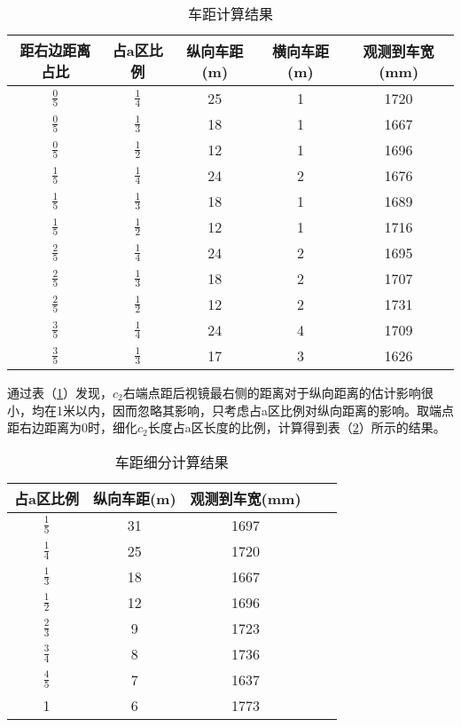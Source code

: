 \documentclass[withoutpreface,bwprint]{cumcmthesis} %
\begin{document}
\begin{table}[!h]
\centering
\caption{车距计算结果}
\label{车距计算结果}
    \begin{tabular}{|c|c|c|c|c|}
    \hline
    距右边距离占比                        & 占a区比例                        & 纵向车距(m) & 横向车距(m) & 观测到车宽(mm) \\ \hline
    $\frac{0}{5}$ & $\frac{1}{4}$ & 25   & 1    & 1720  \\ \hline
    $\frac{0}{5}$ & $\frac{1}{3}$ & 18   & 1    & 1667  \\ \hline
    $\frac{0}{5}$ & $\frac{1}{2}$ & 12   & 1    & 1696  \\ \hline
    $\frac{1}{5}$ & $\frac{1}{4}$ & 24   & 2   & 1676  \\ \hline
    $\frac{1}{5}$ & $\frac{1}{3}$ & 18   & 1    & 1689  \\ \hline
    $\frac{1}{5}$ & $\frac{1}{2}$ & 12   & 1    & 1716  \\ \hline
    $\frac{2}{5}$ & $\frac{1}{4}$ & 24   & 2    & 1695  \\ \hline
    $\frac{2}{5}$ & $\frac{1}{3}$ & 18   & 2    & 1707  \\ \hline
    $\frac{2}{5}$ & $\frac{1}{2}$ & 12   & 2    & 1731  \\ \hline
    $\frac{3}{5}$ & $\frac{1}{4}$ & 24   & 4    & 1709  \\ \hline
   	$\frac{3}{5}$ & $\frac{1}{3}$ & 17   & 3    & 1626  \\ \hline
    \end{tabular}
\end{table}

\par 通过表（\ref{车距计算结果}）发现，$c_2$右端点距后视镜最右侧的距离对于纵向距离的估计影响很小，均在1米以内，因而忽略其影响，只考虑占a区比例对纵向距离的影响。取端点距右边距离为0时，细化$c_2$长度占a区长度的比例，计算得到表（\ref{车距细分计算结果}）所示的结果。
\begin{table}[!h]
\centering
\caption{车距细分计算结果}
\label{车距细分计算结果}
    \begin{tabular}{|c|c|c|c|c|}
    \hline
  	占a区比例  & 纵向车距(m)  & 观测到车宽(mm) \\ \hline	
	$\frac{1}{5}$ & 31       	& 1697  \\ \hline
	$\frac{1}{4}$ & 25       	& 1720  \\ \hline
	$\frac{1}{3}$ & 18       	& 1667 \\ \hline
	$\frac{1}{2}$ & 12      	& 1696  \\ \hline
	$\frac{2}{3}$ & 9      	& 1723  \\ \hline
	$\frac{3}{4}$ & 8      	& 1736  \\ \hline
	$\frac{4}{5}$ & 7      	& 1637 \\ \hline
	1             & 6      	& 1773  \\ \hline
    \end{tabular}
\end{table}
\end{document}
